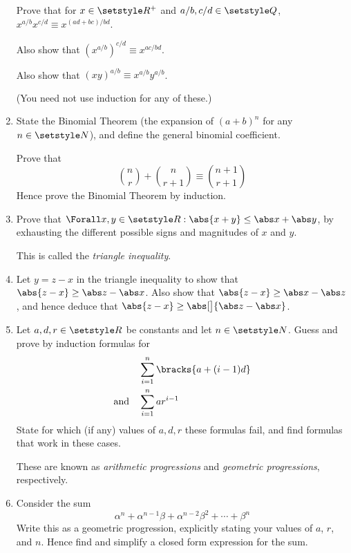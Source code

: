 \begin{enumerate}
  Prove that for \(x \in \Reals^+\) and \(a/b, c/d \in \Rationals\),
  \(x^{a/b} x^{c/d} \equiv x^{(ad + bc)/bd}\).

  Also show that \((x^{a/b})^{c/d} \equiv x^{ac/bd}\).

  Also show that \((xy)^{a/b} \equiv x^{a/b} y^{a/b}\).

  (You need not use induction for any of these.)
 \item
  State the Binomial Theorem
  (the expansion of \((a + b)^n\) for any \(n \in \Naturals\)), and define the
  general binomial coefficient.

  Prove that
  \begin{equation*}
   \binom nr + \binom n{r + 1} \equiv \binom{n + 1}{r + 1}
  \end{equation*}
  Hence prove the Binomial Theorem by induction.
 \item
  Prove that \(\Forall x, y \in \Reals : \abs{x + y} \le \abs x + \abs y\), by
  exhausting the different possible signs and magnitudes of \(x\) and \(y\).

  This is called the \emph{triangle inequality}.
 \item
  Let \(y = z - x\) in the triangle inequality to show that
  \(\abs{z - x} \ge \abs z - \abs x\). Also show that
  \(\abs{z - x} \ge \abs x - \abs z\), and hence deduce that
  \(\abs{z - x} \ge \abs[\big]{\abs z - \abs x}\).
 \item
  Let \(a, d, r \in \Reals\) be constants and let \(n \in \Naturals\).
  Guess and prove by induction formulas for
  \begin{align*}
   &\sum_{i = 1}^n \bracks{a + (i - 1)d} \\
   \text{and}\quad&\sum_{i = 1}^n ar^{i - 1}
  \end{align*}
  State for which (if any) values of \(a, d, r\) these formulas fail, and find
  formulas that work in these cases.

  These are known as \emph{arithmetic progressions} and
  \emph{geometric progressions}, respectively.
 \item
  Consider the sum
  \begin{equation*}
   \alpha^n + \alpha^{n - 1}\beta + \alpha^{n - 2}\beta^2 + \dotsb + \beta^n
  \end{equation*}
  Write this as a geometric progression, explicitly stating your values of
  \(a\), \(r\), and \(n\). Hence find and simplify a closed form expression for
  the sum.


\end{enumerate}
